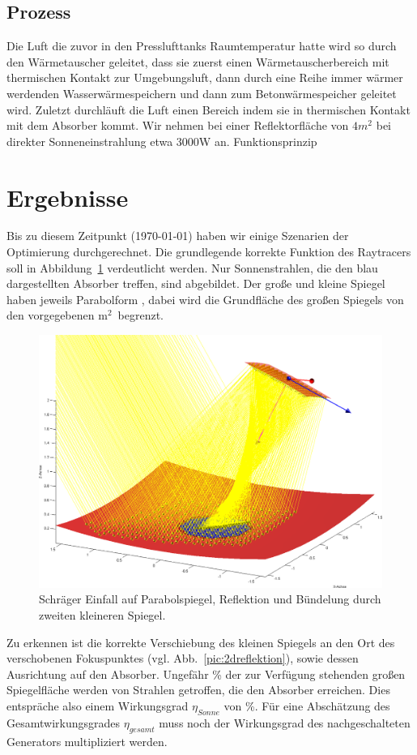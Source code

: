 \documentclass[fontsize=10pt,paper=a4,bibliography=totoc]{scrartcl}
\begin{document}
\subsection{Prozess}
Die Luft die zuvor in den Presslufttanks Raumtemperatur hatte wird so durch den Wärmetauscher geleitet, dass sie zuerst einen Wärmetauscherbereich mit thermischen Kontakt zur Umgebungsluft, dann durch eine Reihe immer wärmer werdenden Wasserwärmespeichern und dann zum Betonwärmespeicher geleitet wird. Zuletzt durchläuft die Luft einen Bereich indem sie in thermischen Kontakt mit dem Absorber kommt.
Wir nehmen bei einer Reflektorfläche von $4m^2$ bei direkter Sonneneinstrahlung etwa 3000W an.
Funktionsprinzip

\section{Ergebnisse}
Bis zu diesem Zeitpunkt (\today) haben wir einige Szenarien der Optimierung durchgerechnet. Die grundlegende korrekte Funktion des Raytracers soll in Abbildung~\ref{pic:netteReflektion} verdeutlicht werden. Nur Sonnenstrahlen, die den blau dargestellten Absorber treffen, sind abgebildet. Der große und kleine Spiegel haben jeweils Parabolform , dabei wird die Grundfläche des großen Spiegels von den vorgegebenen \unit[10]{m$^2$} begrenzt.
\begin{figure}[htb]
	\centering
	\includegraphics[width=\textwidth]{images/netteReflektion}
	\caption[Bündelung schräg]{Schräger Einfall auf Parabolspiegel, Reflektion und Bündelung durch zweiten kleineren Spiegel.}
	\label{pic:netteReflektion}
\end{figure}
Zu erkennen ist die korrekte Verschiebung des kleinen Spiegels an den Ort des verschobenen Fokuspunktes (vgl. Abb.~\ref{pic:2dreflektion}), sowie dessen Ausrichtung auf den Absorber.
Ungefähr \unit[40]{\%} der zur Verfügung stehenden großen Spiegelfläche werden von Strahlen getroffen, die den Absorber erreichen. Dies entspräche also einem Wirkungsgrad $\eta_{Sonne}$ von \unit[40]{\%}. Für eine Abschätzung des Gesamtwirkungsgrades $\eta_{gesamt}$ muss noch der Wirkungsgrad des nachgeschalteten Generators multipliziert werden.



\end{document}
